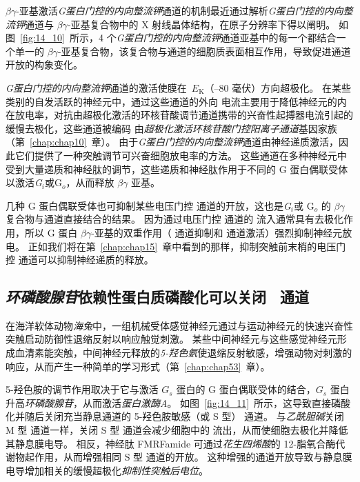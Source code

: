$\beta \gamma$-亚基激活\textit{G蛋白门控的内向整流钾}通道的机制最近通过解析\textit{G蛋白门控的内向整流钾}通道与 $\beta \gamma$-亚基复合物中的 X 射线晶体结构，在原子分辨率下得以阐明。
如图~\ref{fig:14_10}~所示，4 个\textit{G蛋白门控的内向整流钾}通道亚基中的每一个都结合一个单一的 $\beta \gamma$-亚基复合物，该复合物与通道的细胞质表面相互作用，导致促进通道开放的构象变化。


\textit{G蛋白门控的内向整流钾}通道的激活使膜在~$E_\text{K}$（–80 毫伏）方向超极化。
在某些类别的自发活跃的神经元中，通过这些通道的外向  电流主要用于降低神经元的内在放电率，对抗由超极化激活的环核苷酸调节通道携带的兴奋性起搏器电流引起的缓慢去极化，这些通道被编码 由\textit{超极化激活环核苷酸门控阳离子通道}基因家族（第~\ref{chap:chap10}~章）。
由于\textit{G蛋白门控的内向整流钾}通道由神经递质激活，因此它们提供了一种突触调节可兴奋细胞放电率的方法。
这些通道在多种神经元中受到大量递质和神经肽的调节，这些递质和神经肽作用于不同的 G 蛋白偶联受体以激活\textit{G$_i $}或G$_o$，从而释放 $\beta \gamma$ 亚基。


几种 G 蛋白偶联受体也可抑制某些电压门控  通道的开放，这也是\textit{G$_i $}或 G$_o$ 的 $\beta \gamma$ 复合物与通道直接结合的结果。
因为通过电压门控  通道的  流入通常具有去极化作用，所以 G 蛋白 $\beta \gamma$-亚基的双重作用（ 通道抑制和  通道激活）强烈抑制神经元放电。
正如我们将在第~\ref{chap:chap15}~章中看到的那样，抑制突触前末梢的电压门控  通道可以抑制神经递质的释放。



\subsection{\textit{环磷酸腺苷}依赖性蛋白质磷酸化可以关闭~ 通道}

在海洋软体动物\textit{海兔}中，一组机械受体感觉神经元通过与运动神经元的快速兴奋性突触启动防御性退缩反射以响应触觉刺激。
某些中间神经元与这些感觉神经元形成血清素能突触，中间神经元释放的\textit{5-羟色氨}使退缩反射敏感，增强动物对刺激的响应，从而产生一种简单的学习形式（第~\ref{chap:chap53}~章）。


5-羟色胺的调节作用取决于它与激活 $ G_s $ 蛋白的 G 蛋白偶联受体的结合，$ G_s $ 蛋白升高\textit{环磷酸腺苷}，从而激活\textit{蛋白激酶A}。
如图~\ref{fig:14_11}~所示，这导致直接磷酸化并随后关闭充当静息通道的 5-羟色胺敏感（或 S 型） 通道。
与\textit{乙酰胆碱}关闭 M 型  通道一样，关闭 S 型  通道会减少细胞中的  流出，从而使细胞去极化并降低其静息膜电导。
相反，神经肽 FMRFamide 可通过\textit{花生四烯酸}的 12-脂氧合酶代谢物起作用，从而增强相同 S 型  通道的开放。
这种增强的通道开放导致与静息膜电导增加相关的缓慢超极化\textit{抑制性突触后电位}。


